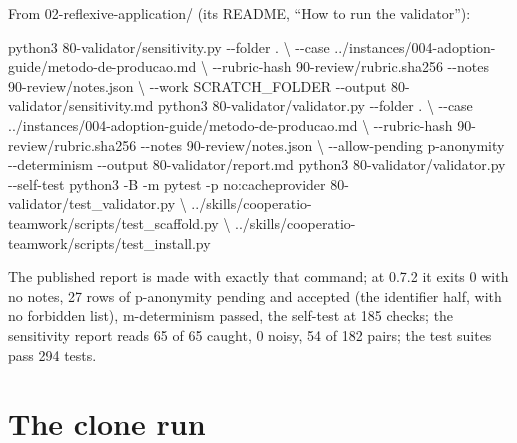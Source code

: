 \documentclass[
  american,
  10pt,
]{report}
\newenvironment{Shaded}{\begin{snugshade}}{\end{snugshade}}
\newcommand{\AttributeTok}[1]{\textcolor[rgb]{0.13,0.29,0.53}{#1}}
\newcommand{\DataTypeTok}[1]{\textcolor[rgb]{0.13,0.29,0.53}{#1}}
\newcommand{\ExtensionTok}[1]{#1}
\newcommand{\NormalTok}[1]{#1}
\renewenvironment{Shaded}{%
  \def\FrameCommand{{\color{rulecolor}\vrule width 2pt}\hspace{6pt}\colorbox{shadecolor}}%
  \MakeFramed{\advance\hsize-\width\FrameRestore}\small}%
  {\endMakeFramed}
\renewcommand{\texttt}[1]{{\ttfamily\hyphenchar\font=-1 #1}}
\begin{document}
From
\texttt{02-\allowbreak{}reflexive-\allowbreak{}application/\allowbreak{}}
(its README, ``How to run the validator''):

\begin{Shaded}
\begin{Highlighting}[]
\ExtensionTok{python3}\NormalTok{ 80{-}validator/sensitivity.py }\AttributeTok{{-}{-}folder}\NormalTok{ . }\DataTypeTok{\textbackslash{}}
    \AttributeTok{{-}{-}case}\NormalTok{ ../instances/004{-}adoption{-}guide/metodo{-}de{-}producao.md }\DataTypeTok{\textbackslash{}}
    \AttributeTok{{-}{-}rubric{-}hash}\NormalTok{ 90{-}review/rubric.sha256 }\AttributeTok{{-}{-}notes}\NormalTok{ 90{-}review/notes.json }\DataTypeTok{\textbackslash{}}
    \AttributeTok{{-}{-}work}\NormalTok{ SCRATCH\_FOLDER }\AttributeTok{{-}{-}output}\NormalTok{ 80{-}validator/sensitivity.md}
\ExtensionTok{python3}\NormalTok{ 80{-}validator/validator.py }\AttributeTok{{-}{-}folder}\NormalTok{ . }\DataTypeTok{\textbackslash{}}
    \AttributeTok{{-}{-}case}\NormalTok{ ../instances/004{-}adoption{-}guide/metodo{-}de{-}producao.md }\DataTypeTok{\textbackslash{}}
    \AttributeTok{{-}{-}rubric{-}hash}\NormalTok{ 90{-}review/rubric.sha256 }\AttributeTok{{-}{-}notes}\NormalTok{ 90{-}review/notes.json }\DataTypeTok{\textbackslash{}}
    \AttributeTok{{-}{-}allow{-}pending}\NormalTok{ p{-}anonymity }\AttributeTok{{-}{-}determinism} \AttributeTok{{-}{-}output}\NormalTok{ 80{-}validator/report.md}
\ExtensionTok{python3}\NormalTok{ 80{-}validator/validator.py }\AttributeTok{{-}{-}self{-}test}
\ExtensionTok{python3} \AttributeTok{{-}B} \AttributeTok{{-}m}\NormalTok{ pytest }\AttributeTok{{-}p}\NormalTok{ no:cacheprovider 80{-}validator/test\_validator.py }\DataTypeTok{\textbackslash{}}
\NormalTok{    ../skills/cooperatio{-}teamwork/scripts/test\_scaffold.py }\DataTypeTok{\textbackslash{}}
\NormalTok{    ../skills/cooperatio{-}teamwork/scripts/test\_install.py}
\end{Highlighting}
\end{Shaded}

The published report is made with exactly that command; at 0.7.2 it
exits 0 with no notes, 27 rows of \texttt{p-\allowbreak{}anonymity}
pending and accepted (the identifier half, with no forbidden list),
\texttt{m-\allowbreak{}determinism} passed, the self-test at 185 checks;
the sensitivity report reads 65 of 65 caught, 0 noisy, 54 of 182 pairs;
the test suites pass 294 tests.

\section{The clone run}\label{the-clone-run}
\end{document}
